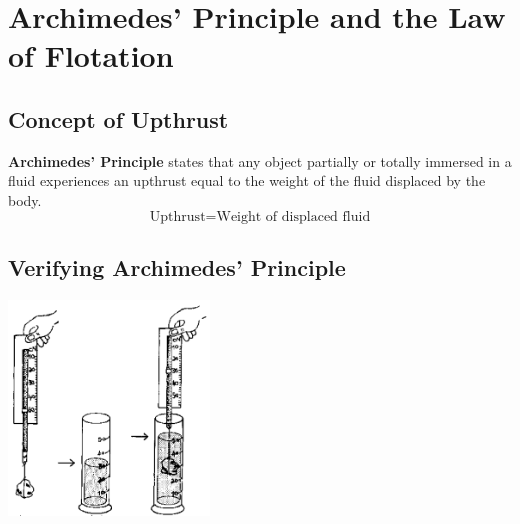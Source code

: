 \section{Archimedes' Principle and the Law of Flotation}

\begin{multicols}{2}


\section*{Concept of Upthrust}
\textbf{Archimedes' Principle} states that any object partially or totally immersed in a fluid experiences an upthrust equal to the weight of the fluid displaced by the body.
$$ \text{Upthrust} = \text{Weight of displaced fluid}$$

\subsection{Verifying Archimedes' Principle}

\begin{center}
\includegraphics[width=0.4\textwidth]{./img/source/upthrust.png}
\end{center}


\end{multicols}
